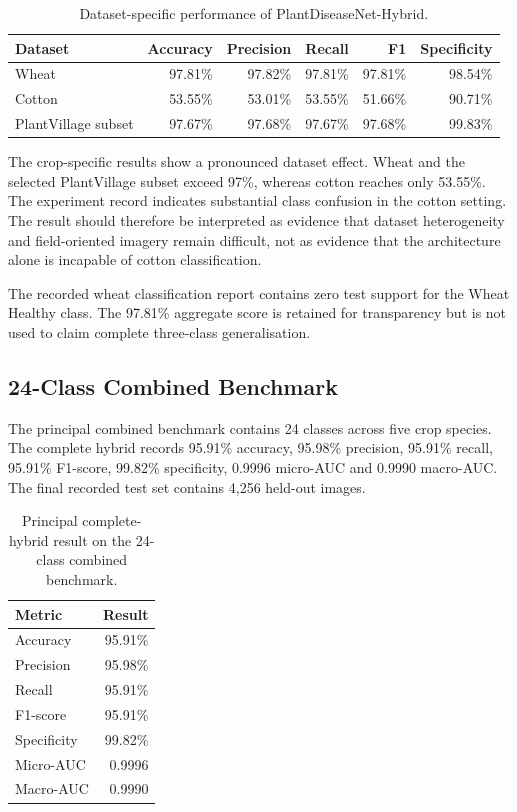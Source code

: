 \documentclass[a4paper,fleqn]{cas-dc}
\begin{document}
\begin{table}[!t]
\centering
\caption{Dataset-specific performance of PlantDiseaseNet-Hybrid.}
\label{tab:primary}
\small
\begin{tabular}{lrrrrr}
\toprule
Dataset & Accuracy & Precision & Recall & F1 & Specificity \\
\midrule
Wheat & 97.81\% & 97.82\% & 97.81\% & 97.81\% & 98.54\% \\
Cotton & 53.55\% & 53.01\% & 53.55\% & 51.66\% & 90.71\% \\
PlantVillage subset & 97.67\% & 97.68\% & 97.67\% & 97.68\% & 99.83\% \\
\bottomrule
\end{tabular}
\end{table}

The crop-specific results show a pronounced dataset effect. Wheat and the selected PlantVillage subset exceed 97\%, whereas cotton reaches only 53.55\%. The experiment record indicates substantial class confusion in the cotton setting. The result should therefore be interpreted as evidence that dataset heterogeneity and field-oriented imagery remain difficult, not as evidence that the architecture alone is incapable of cotton classification.

The recorded wheat classification report contains zero test support for the Wheat Healthy class. The 97.81\% aggregate score is retained for transparency but is not used to claim complete three-class generalisation.

\subsection{24-Class Combined Benchmark}
The principal combined benchmark contains 24 classes across five crop species. The complete hybrid records 95.91\% accuracy, 95.98\% precision, 95.91\% recall, 95.91\% F1-score, 99.82\% specificity, 0.9996 micro-AUC and 0.9990 macro-AUC. The final recorded test set contains 4,256 held-out images.

\begin{table}[!t]
\centering
\caption{Principal complete-hybrid result on the 24-class combined benchmark.}
\label{tab:mainresult}
\small
\begin{tabular}{lr}
\toprule
Metric & Result \\
\midrule
Accuracy & 95.91\% \\
Precision & 95.98\% \\
Recall & 95.91\% \\
F1-score & 95.91\% \\
Specificity & 99.82\% \\
Micro-AUC & 0.9996 \\
Macro-AUC & 0.9990 \\
\bottomrule
\end{tabular}
\end{table}
\end{document}

